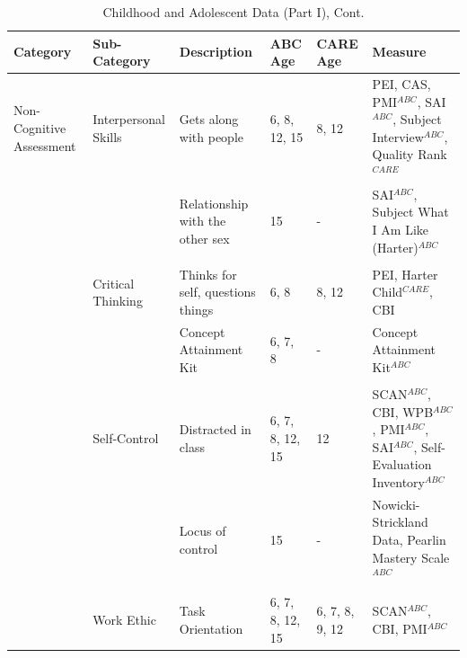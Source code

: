 \documentclass[static]{JJH-Beamer}
\begin{document}
\begin{frame}
 \addtocounter{framenumber}{-1}

\begin{table}[H]
\addtocounter{table}{-1}
\caption{Childhood and Adolescent Data (Part I), Cont.}
\begin{center}
\begin{tiny}
\begin{tabular}{L{1.2cm} C{1.4cm} C{2.3cm} C{1cm} C{1cm} C{2.7cm}}
\toprule
\textbf{Category}	&	\textbf{Sub-Category}	&	\textbf{Description}	&	\textbf{ABC Age}  	&  \textbf{CARE Age}  & 	\textbf{Measure}	\\ \midrule
Non-Cognitive Assessment	&	Interpersonal Skills	&	Gets along with people	&	6, 8, 12, 15	& 	8, 12	&	PEI, CAS, PMI$^{ABC}$, SAI$^{ABC}$, Subject Interview$^{ABC}$, Quality Rank$^{CARE}$	\\
	&		&	Relationship with the other sex	&	15	&	- 	&	 SAI$^{ABC}$, Subject What I Am Like (Harter)$^{ABC}$	\\
	&	\\
	&	Critical Thinking	&	Thinks for self, questions things	&	6, 8	 &	8, 12	&	PEI, Harter Child$^{CARE}$, CBI	\\
	&		&	Concept Attainment Kit	&	6, 7, 8	&	- 	&	Concept Attainment Kit$^{ABC}$	\\
	&	\\
	&	Self-Control	&	Distracted in class	&	6, 7, 8, 12, 15	&	12	&	SCAN$^{ABC}$, CBI, WPB$^{ABC}$, PMI$^{ABC}$, SAI$^{ABC}$, Self-Evaluation Inventory$^{ABC}$	\\
	&		&	Locus of control	&	15	&	- 	&	Nowicki-Strickland Data, Pearlin Mastery Scale$^{ABC}$	\\
	&	\\
	&	Work Ethic	&	Task Orientation	&	6, 7, 8, 12, 15	&	6, 7, 8, 9, 12 	&	SCAN$^{ABC}$, CBI, PMI$^{ABC}$		\\
\bottomrule
\end{tabular}
\end{tiny}
\end{center}
\end{table}

\end{frame}
\end{document}
